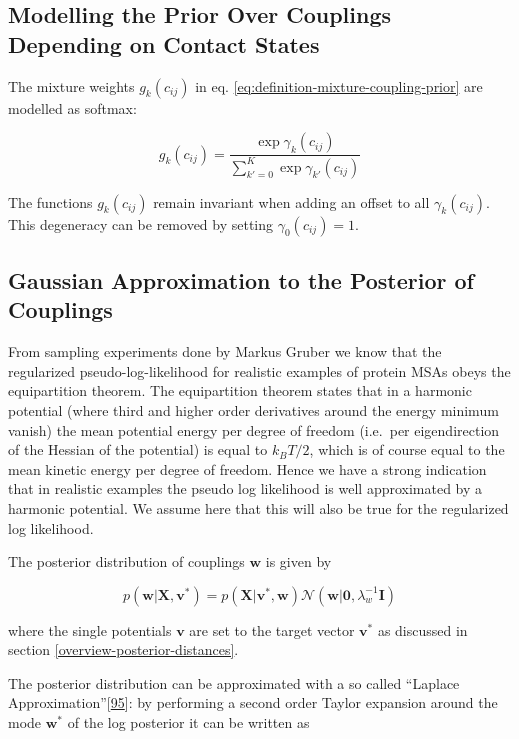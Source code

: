 \documentclass[11pt,a4paper,twoside]{book}
\newcommand{\Gauss}{\mathcal{N}}
\newcommand{\I}{\mathbf{I}}
\newcommand{\cij}{c_{ij}}
\renewcommand{\v}{\mathbf{v}}
\newcommand{\w}{\mathbf{w}}
\newcommand{\X}{\mathbf{X}}
\theoremstyle{definition}
\theoremstyle{definition}
\theoremstyle{remark}
\begin{document}
\subsection{Modelling the Prior Over Couplings Depending on Contact
States}\label{methods-coupling-prior}

The mixture weights \(g_k(\cij)\) in eq.
\eqref{eq:definition-mixture-coupling-prior} are modelled as softmax:

\begin{equation}
    g_k(\cij) = \frac{\exp \gamma_k(\cij)}{\sum_{k'=0}^K \exp \gamma_{k'}(\cij)} 
\label{eq:def-g-k-binary}
\end{equation}

The functions \(g_k(\cij)\) remain invariant when adding an offset to
all \(\gamma_k(\cij)\). This degeneracy can be removed by setting
\(\gamma_0(\cij)=1\).

\subsection{Gaussian Approximation to the Posterior of
Couplings}\label{laplace-approx}

From sampling experiments done by Markus Gruber we know that the
regularized pseudo-log-likelihood for realistic examples of protein MSAs
obeys the equipartition theorem. The equipartition theorem states that
in a harmonic potential (where third and higher order derivatives around
the energy minimum vanish) the mean potential energy per degree of
freedom (i.e.~per eigendirection of the Hessian of the potential) is
equal to \(k_B T/2\), which is of course equal to the mean kinetic
energy per degree of freedom. Hence we have a strong indication that in
realistic examples the pseudo log likelihood is well approximated by a
harmonic potential. We assume here that this will also be true for the
regularized log likelihood.

The posterior distribution of couplings \(\w\) is given by

\begin{equation}
p(\w | \X , \v^*) = p(\X | \v^*, \w) \Gauss (\w | \mathbf{0}, \lambda_w^{-1} \I)
\end{equation}

where the single potentials \(\v\) are set to the target vector \(\v^*\)
as discussed in section \ref{overview-posterior-distances}.

The posterior distribution can be approximated with a so called
``Laplace Approximation''{[}\protect\hyperlink{ref-Murphy2012}{95}{]}:
by performing a second order Taylor expansion around the mode \(\w^*\)
of the log posterior it can be written as
\end{document}
